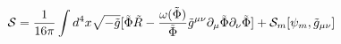 \begin{equation}
\label{acao_JF}
 {\cal{S}} = \frac{1}{16 \pi} \int d^4 x \sqrt{-\tilde{g}} 
[ \tilde{\Phi} \tilde{R} - \frac{\omega(\tilde{\Phi})}{\tilde{\Phi}}
\tilde{g} ^{\mu \nu} \partial _{\mu} \tilde{\Phi} \partial _{\nu} 
\tilde{\Phi} ] + {\cal{S}} _{m} [\psi _m, \tilde{g} _{\mu \nu}]
\end{equation}

